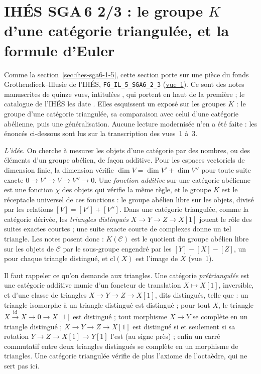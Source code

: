 \section[IHÉS SGA\,6 2/3 : le groupe $K$ d'une catégorie triangulée, la formule d'Euler]{IHÉS SGA\,6 2/3 : le groupe $K$ d'une catégorie triangulée, et la formule d'Euler\protect{}}\label{sec:ihes-sga6-2-3}

Comme la section~\ref{sec:ihes-sga6-1-5}, cette section porte sur une pièce du fonds Grothendieck--Illusie de l'IHÉS, \texttt{FG\_IL\_5\_SGA6\_2\_3} (\href{https://grothendieck.commutator.io/illusie/\#FG_IL_5_SGA6_2_3/1/p1}{vue~1}). Ce sont des notes manuscrites de quinze vues, intitulées , qui portent en haut de la première  ; le catalogue de l'IHÉS les date . Elles esquissent un exposé sur les groupes $K$ : le groupe d'une catégorie triangulée, sa comparaison avec celui d'une catégorie abélienne, puis une généralisation. Aucune lecture modernisée n'en a été faite : les énoncés ci-dessous sont lus sur la transcription des vues~1 à~3.

\emph{L'idée.} On cherche à mesurer les objets d'une catégorie par des nombres, ou des éléments d'un groupe abélien, de façon additive. Pour les espaces vectoriels de dimension finie, la dimension vérifie $\dim V = \dim V' + \dim V''$ pour toute suite exacte $0 \to V' \to V \to V'' \to 0$. Une \emph{fonction additive} sur une catégorie abélienne est une fonction $\chi$ des objets qui vérifie la même règle, et le groupe $K$ est le réceptacle universel de ces fonctions : le groupe abélien libre sur les objets, divisé par les relations $[V] = [V'] + [V'']$. Dans une catégorie triangulée, comme la catégorie dérivée, les \emph{triangles distingués} $X \to Y \to Z \to X[1]$ jouent le rôle des suites exactes courtes ; une suite exacte courte de complexes donne un tel triangle. Les notes posent donc : $K(\mathcal C)$ est le quotient du groupe abélien libre sur les objets de $\mathcal C$ par le sous-groupe engendré par les $[Y] - [X] - [Z]$, un pour chaque triangle distingué, et $\mathrm{cl}(X)$ est l'image de $X$ (vue~1).

Il faut rappeler ce qu'on demande aux triangles. Une catégorie \emph{prétriangulée} est une catégorie additive munie d'un foncteur de translation $X \mapsto X[1]$, inversible, et d'une classe de triangles $X \to Y \to Z \to X[1]$, dits distingués, telle que : un triangle isomorphe à un triangle distingué est distingué ; pour tout $X$, le triangle $X \xrightarrow{\mathrm{id}} X \to 0 \to X[1]$ est distingué ; tout morphisme $X \to Y$ se complète en un triangle distingué ; $X \to Y \to Z \to X[1]$ est distingué si et seulement si sa rotation $Y \to Z \to X[1] \to Y[1]$ l'est (au signe près) ; enfin un carré commutatif entre deux triangles distingués se complète en un morphisme de triangles. Une catégorie triangulée vérifie de plus l'axiome de l'octaèdre, qui ne sert pas ici.

